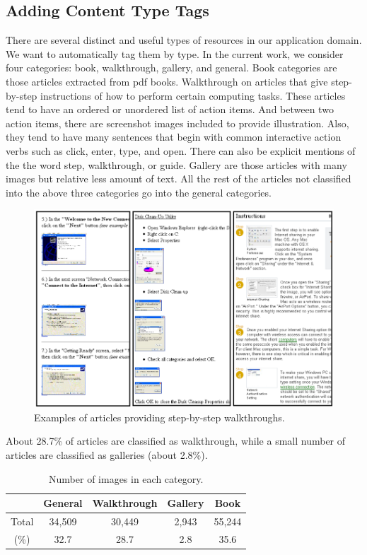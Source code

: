 \documentclass{www2010-submission}
\begin{document}
\subsection{Adding Content Type Tags}

There are several distinct and useful types of resources in our
application domain. We want to automatically tag them by type. In
the current work, we consider four categories: book, walkthrough,
gallery, and general. Book categories are those articles extracted
from pdf books. Walkthrough on articles that give step-by-step
instructions of how to perform certain computing tasks. These
articles tend to have an ordered or unordered list of action
items. And between two action items, there are screenshot images
included to provide illustration. Also, they tend to have many
sentences that begin with common interactive action verbs such as
click, enter, type, and open. There can also be explicit mentions
of the the word step, walkthrough, or guide. Gallery are those
articles with many images but relative less amount of text. All
the rest of the articles not classified into the above three
categories go into the general categories.


\begin{figure}
\includegraphics[width=1\columnwidth]{figure/walkthrough_examples.png}
\caption{Examples of articles providing step-by-step walkthroughs.}
\end{figure}

About 28.7\% of articles are classified as walkthrough, while a
small number of articles are classified as galleries (about 2.8\%).

\begin{table}
\centering \caption{Number of images in each category.} \label{}

\begin{tabular}{|c|c|c|c|c|}
\hline
      & General & Walkthrough & Gallery & Book \\
\hline
Total & 34,509 & 30,449 & 2,943 & 55,244\\
 \hline
(\%)  & 32.7 & 28.7 & 2.8 & 35.6 \\
\hline
\end{tabular}
\end{table}
\end{document}
